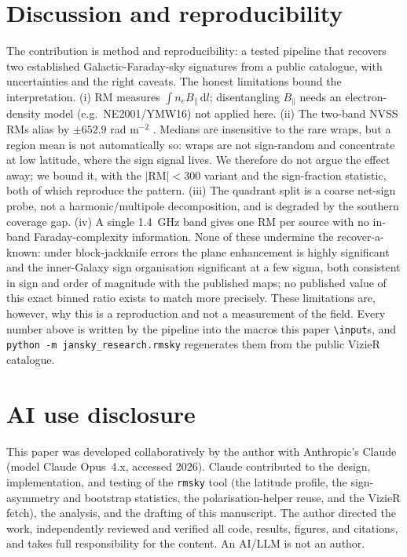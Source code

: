 \documentclass[twocolumn]{aastex631}
\newcommand{\code}[1]{\texttt{#1}}
\begin{document}
\section{Discussion and reproducibility}
The contribution is method and reproducibility: a tested pipeline that recovers two established
Galactic-Faraday-sky signatures from a public catalogue, with uncertainties and the right caveats. The
honest limitations bound the interpretation. (i) RM measures $\int n_e B_\parallel\,\mathrm{d}l$;
disentangling $B_\parallel$ needs an electron-density model (e.g.\ NE2001/YMW16) not applied here.
(ii) The two-band NVSS RMs alias by $\pm652.9$ rad m$^{-2}$ \citep{taylor2009}. Medians are
insensitive to the rare wraps, but a region mean is not automatically so: wraps are not
sign-random and concentrate at low latitude, where the sign signal lives. We therefore do not
argue the effect away; we bound it, with the $|\mathrm{RM}|<300$ variant and the sign-fraction
statistic, both of which reproduce the pattern. (iii) The quadrant split is a coarse net-sign
probe, not a harmonic/multipole decomposition, and is degraded by the southern coverage gap.
(iv) A single 1.4~GHz band gives one RM per source with no in-band Faraday-complexity
information. None of these undermine the recover-a-known: under block-jackknife errors the
plane enhancement is highly significant and the inner-Galaxy sign organisation significant at a
few sigma, both consistent in sign and order of magnitude with the published maps; no published value of this exact binned ratio exists to match more precisely. These limitations
are, however, why this is a reproduction and not a measurement of the field.
Every number above is written by the pipeline into the macros this paper \code{\textbackslash input}s,
and \code{python -m jansky\_research.rmsky} regenerates them from the public VizieR catalogue.

\section*{AI use disclosure}
This paper was developed collaboratively by the author with Anthropic's Claude
\citep{anthropicclaude} (model Claude Opus~4.x, accessed 2026). Claude contributed to the design,
implementation, and testing of the \code{rmsky} tool (the latitude profile, the sign-asymmetry and
bootstrap statistics, the polarisation-helper reuse, and the VizieR fetch), the analysis, and the
drafting of this manuscript. The author directed the work, independently reviewed and verified all code,
results, figures, and citations, and takes full responsibility for the content. An AI/LLM is not an
author.
\end{document}
